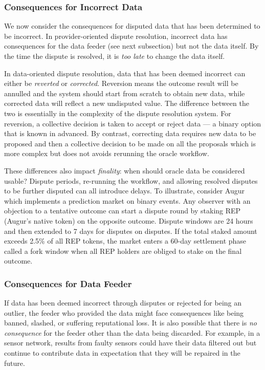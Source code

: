 \subsubsection{Consequences for Incorrect Data}

We now consider the consequences for disputed data that has been determined to be incorrect. In provider-oriented dispute resolution, incorrect data has consequences for the data feeder (see next subsection) but not the data itself. By the time the dispute is resolved, it is \textit{too late} to change the data itself. 

In data-oriented dispute resolution, data that has been deemed incorrect can either be \textit{reverted} or \textit{corrected}. Reversion means the outcome result will be annulled and the system should start from scratch to obtain new data, while corrected data will reflect a new undisputed value. The difference between the two is essentially in the complexity of the dispute resolution system. For reversion, a collective decision is taken to accept or reject data --- a binary option that is known in advanced. By contrast, correcting data requires new data to be proposed and then a collective decision to be made on all the proposals which is more complex but does not avoids rerunning the oracle workflow.

These differences also impact \textit{finality}: when should oracle data be considered usable? Dispute periods, re-running the workflow, and allowing resolved disputes to be further disputed can all introduce delays. To illustrate, consider  Augur~\cite{peterson2015augur} which implements a prediction market on binary events. Any observer with an objection to a tentative outcome can start a dispute round by staking REP (Augur's native token) on the opposite outcome. Dispute windows are 24 hours and then extended to 7 days for disputes on disputes. If the total staked amount exceeds 2.5\% of all REP tokens, the market enters a 60-day settlement phase called a fork window when all REP holders are obliged to stake on the final outcome. 

\subsubsection{Consequences for Data Feeder}

If data has been deemed incorrect through disputes or rejected for being an outlier, the feeder who provided the data might face consequences like being banned, slashed, or suffering reputational loss. It is also possible that there is \textit{no consequence} for the feeder other than the data being discarded. For example, in a sensor network, results from faulty sensors could have their data filtered out but continue to contribute data in expectation that they will be repaired in the future. 

